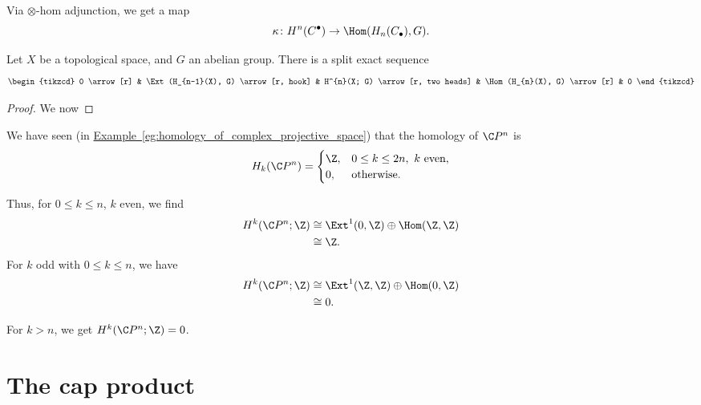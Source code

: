 \documentclass[main.tex]{subfiles}
\begin{document}
Via $\otimes$-hom adjunction, we get a map
\begin{equation*}
  \kappa\colon H^{n}(C^{\bullet}) \to \Hom(H_{n}(C_{\bullet}), G).
\end{equation*}

\begin{theorem}
  Let $X$ be a topological space, and $G$ an abelian group. There is a split exact sequence
  \begin{equation*}
    \begin{tikzcd}
      0
      \arrow[r]
      & \Ext(H_{n-1}(X), G)
      \arrow[r, hook]
      & H^{n}(X; G)
      \arrow[r, two heads]
      & \Hom(H_{n}(X), G)
      \arrow[r]
      & 0
    \end{tikzcd}
  \end{equation*}
\end{theorem}
\begin{proof}
  We now
\end{proof}

\begin{example}
  We have seen (in \hyperref[eg:homology_of_complex_projective_space]{Example~\ref*{eg:homology_of_complex_projective_space}}) that the homology of $\C P^{n}$ is
  \begin{equation*}
    H_{k}(\C P^{n}) =
    \begin{cases}
      \Z, &0 \leq k \leq 2n,\ k \text{ even},\\
      0, &\text{otherwise}.
    \end{cases}
  \end{equation*}

  Thus, for $0 \leq k \leq n$, $k$ even, we find
  \begin{align*}
    H^{k}(\C P^{n}; \Z) &\cong \Ext^{1}(0, \Z) \oplus \Hom(\Z,\Z) \\
    &\cong \Z.
  \end{align*}
  For $k$ odd with $0 \leq k \leq n$, we have
  \begin{align*}
    H^{k}(\C P^{n}; \Z) &\cong \Ext^{1}(\Z, \Z) \oplus \Hom(0,\Z) \\
    &\cong 0.
  \end{align*}

  For $k > n$, we get $H^{k}(\C P^{n}; \Z) = 0$.
\end{example}

\section{The cap product}
\label{sec:the_cap_product}
\end{document}
